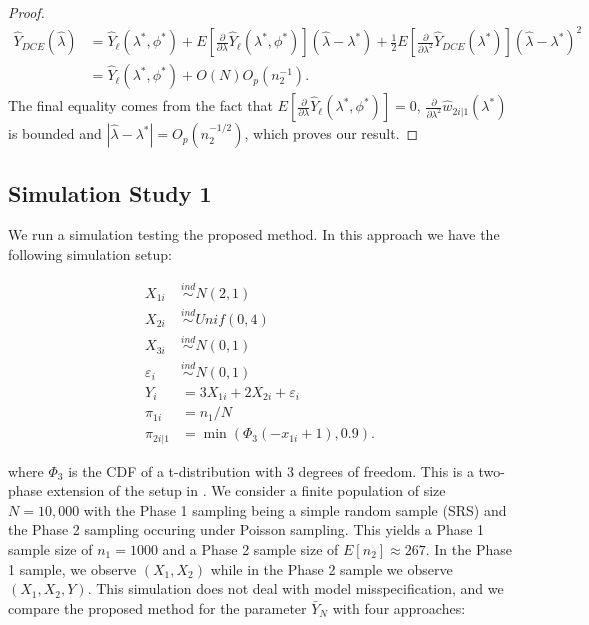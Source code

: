 \documentclass[12pt]{article}
\begin{document}
\begin{proof}
  \begin{align*}
    \hat Y_{DCE}(\hat \lambda) 
    &= \hat Y_\ell(\lambda^*, \phi^*) + 
    E\left[\frac{\partial}{\partial \lambda}\hat Y_\ell(\lambda^*,
    \phi^*)\right](\hat \lambda - \lambda^*) + \frac{1}{2}
    E\left[\frac{\partial}{\partial \lambda^2} \hat Y_{DCE}(\lambda^*)\right] (\hat
    \lambda - \lambda^*)^2\\
    &= \hat Y_\ell(\lambda^*, \phi^*) + O(N)O_p(n_2^{-1}).
  \end{align*}
  The final equality comes from the fact that 
  $E\left[\frac{\partial}{\partial \lambda}\hat Y_\ell(\lambda^*, \phi^*)\right]
  = 0$, $\frac{\partial}{\partial \lambda^2} \hat w_{2i|1}(\lambda^*)$ is
  bounded and $|\hat \lambda - \lambda^*| = O_p(n_2^{-1/2})$, which proves our
  result.
\end{proof}

\subsection{Simulation Study 1}

We run a simulation testing the proposed method. In this approach we have the
following simulation setup:

$$
\begin{aligned}
X_{1i} &\stackrel{ind}{\sim} N(2, 1) \\
X_{2i} &\stackrel{ind}{\sim} Unif(0, 4) \\
X_{3i} &\stackrel{ind}{\sim} N(0, 1) \\
\varepsilon_i &\stackrel{ind}{\sim} N(0, 1) \\
Y_{i} &= 3 X_{1i} + 2 X_{2i} + \varepsilon_i \\
\pi_{1i} &= n_1 / N \\
\pi_{2i|1} &= \min(\Phi_3(-x_{1i} + 1), 0.9).
\end{aligned}
$$

where $\Phi_3$ is the CDF of a t-distribution with 3 degrees of freedom.
This is a two-phase extension of the setup in \cite{kwon2024debiased}. We
consider a finite population of size $N = 10,000$ with the Phase 1 sampling
being a simple random sample (SRS) and the 
Phase 2 sampling occuring under Poisson sampling. This yields a
Phase 1 sample
size of $n_1 = 1000$ and a Phase 2 sample size of
$E[n_2] \approx 267$. In the Phase 1 sample, we observe 
$(X_1, X_2)$ while in the Phase 2 sample we observe $(X_1, X_2, Y)$. This
simulation does not deal with model misspecification, and we compare the
proposed method for the parameter $\bar Y_N$ with four approaches:
\end{document}
